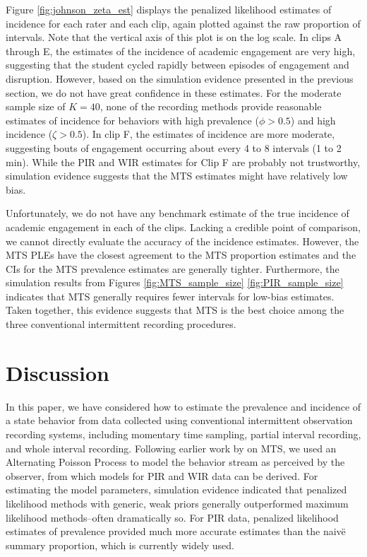 \documentclass[man, noextraspace, floatsintext]{apa6}\usepackage[]{graphicx}\usepackage[]{color}
\begin{document}
Figure \ref{fig:johnson_zeta_est} displays the penalized likelihood estimates of incidence for each rater and each clip, again plotted against the raw proportion of intervals. Note that the vertical axis of this plot is on the log scale. 
In clips A through E, the estimates of the incidence of academic engagement are very high, suggesting that the student cycled rapidly between episodes of engagement and disruption.
However, based on the simulation evidence presented in the previous section, we do not have great confidence in these estimates.
For the moderate sample size of $K = 40$, none of the recording methods provide reasonable estimates of incidence for behaviors with high prevalence ($\phi > 0.5$) and high incidence ($\zeta > 0.5$). In clip F, the estimates of incidence are more moderate, suggesting bouts of engagement occurring about every 4 to 8 intervals (1 to 2 min). While the PIR and WIR estimates for Clip F are probably not trustworthy, simulation evidence suggests that the MTS estimates might have relatively low bias. 

Unfortunately, we do not have any benchmark estimate of the true incidence of academic engagement in each of the clips. 
Lacking a credible point of comparison, we cannot directly evaluate the accuracy of the incidence estimates. 
However, the MTS PLEs have the closest agreement to the MTS proportion estimates and the CIs for the MTS prevalence estimates are generally tighter. 
Furthermore, the simulation results from Figures \ref{fig:MTS_sample_size} \ref{fig:PIR_sample_size} indicates that MTS generally requires fewer intervals for low-bias estimates. 
Taken together, this evidence suggests that MTS is the best choice among the three conventional intermittent recording procedures. 

\section{Discussion}
\label{sec:discussion}

In this paper, we have considered how to estimate the prevalence and incidence of a state behavior from data collected using conventional intermittent observation recording systems, including momentary time sampling, partial interval recording, and whole interval recording. Following earlier work by \citet{Brown1977estimation} on MTS, we used an Alternating Poisson Process to model the behavior stream as perceived by the observer, from which models for PIR and WIR data can be derived. For estimating the model parameters, simulation evidence indicated that penalized likelihood methods with generic, weak priors generally outperformed maximum likelihood methods--often dramatically so. For PIR data, penalized likelihood estimates of prevalence provided much more accurate estimates than the naiv\"e summary proportion, which is currently widely used.
\end{document}
